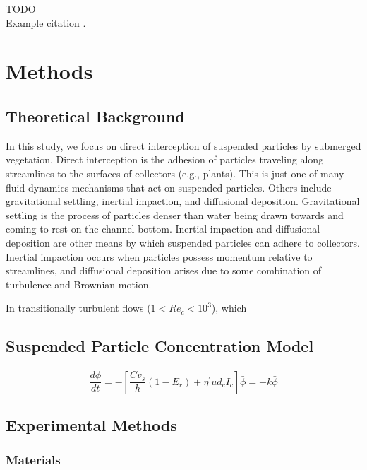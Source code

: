 \documentclass[10pt,a4paper]{article}
\begin{document}
TODO\\
\hfill\break
Example citation \citep{Fauria_2015}.


\section{Methods}

\subsection{Theoretical Background}

In this study, we focus on direct interception of suspended particles by submerged vegetation. Direct interception is the adhesion of particles traveling along streamlines to the surfaces of collectors (e.g., plants). This is just one of many fluid dynamics mechanisms that act on suspended particles. Others include gravitational settling, inertial impaction, and diffusional deposition. Gravitational settling is the process of particles denser than water being drawn towards and coming to rest on the channel bottom. Inertial impaction and diffusional deposition are other means by which suspended particles can adhere to collectors. Inertial impaction occurs when particles possess momentum relative to streamlines, and diffusional deposition arises due to some combination of turbulence and Brownian motion.

In transitionally turbulent flows ($1 < Re_c < 10^3$), which 



\subsection{Suspended Particle Concentration Model}

$$\frac{d\bar{\phi}}{dt} = -[\frac{Cv_s}{h}(1-E_r) + \eta^{\prime}ud_cI_c]\bar{\phi} = -k\bar{\phi}$$

\subsection{Experimental Methods}



\subsubsection{Materials}
\end{document}
